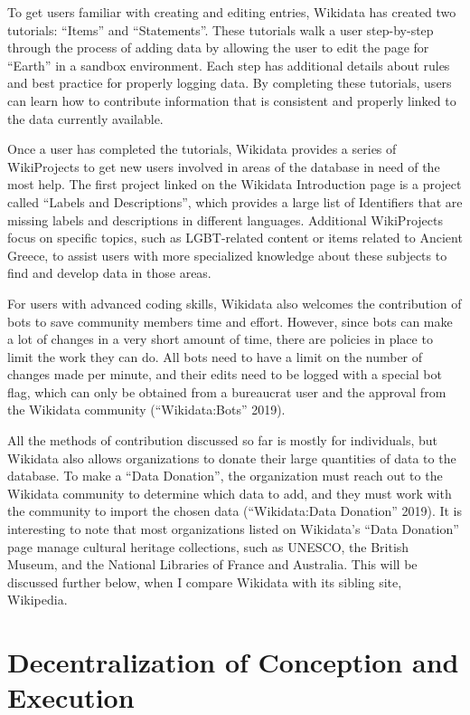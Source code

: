 \documentclass[]{article}
\begin{document}
To get users familiar with creating and editing entries, Wikidata has
created two tutorials: ``Items'' and ``Statements''. These tutorials
walk a user step-by-step through the process of adding data by allowing
the user to edit the page for ``Earth'' in a sandbox environment. Each
step has additional details about rules and best practice for properly
logging data. By completing these tutorials, users can learn how to
contribute information that is consistent and properly linked to the
data currently available.

Once a user has completed the tutorials, Wikidata provides a series of
WikiProjects to get new users involved in areas of the database in need
of the most help. The first project linked on the Wikidata Introduction
page is a project called ``Labels and Descriptions'', which provides a
large list of Identifiers that are missing labels and descriptions in
different languages. Additional WikiProjects focus on specific topics,
such as LGBT-related content or items related to Ancient Greece, to
assist users with more specialized knowledge about these subjects to
find and develop data in those areas.

For users with advanced coding skills, Wikidata also welcomes the
contribution of bots to save community members time and effort. However,
since bots can make a lot of changes in a very short amount of time,
there are policies in place to limit the work they can do. All bots need
to have a limit on the number of changes made per minute, and their
edits need to be logged with a special bot flag, which can only be
obtained from a bureaucrat user and the approval from the Wikidata
community (``Wikidata:Bots'' 2019).

All the methods of contribution discussed so far is mostly for
individuals, but Wikidata also allows organizations to donate their
large quantities of data to the database. To make a ``Data Donation'',
the organization must reach out to the Wikidata community to determine
which data to add, and they must work with the community to import the
chosen data (``Wikidata:Data Donation'' 2019). It is interesting to note
that most organizations listed on Wikidata's ``Data Donation'' page
manage cultural heritage collections, such as UNESCO, the British
Museum, and the National Libraries of France and Australia. This will be
discussed further below, when I compare Wikidata with its sibling site,
Wikipedia.

\hypertarget{decentralization-of-conception-and-execution}{%
\section{Decentralization of Conception and
Execution}\label{decentralization-of-conception-and-execution}}
\end{document}
